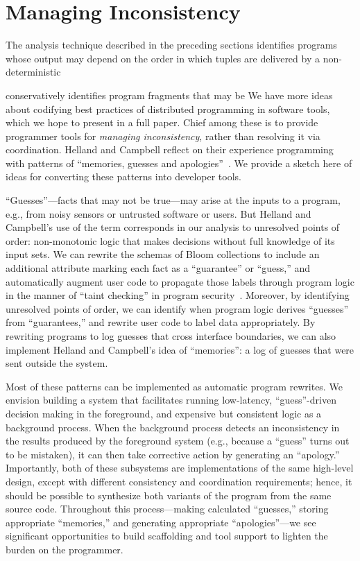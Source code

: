 \section{Managing Inconsistency}
\label{sec:inconsistency}
The analysis technique described in the preceding sections identifies programs
whose output may depend on the order in which tuples are delivered by a
non-deterministic 

 conservatively
identifies program fragments that may be 
We have more ideas about codifying best practices of distributed programming in
software tools, which we hope to present in a full paper.  Chief among these is
to provide programmer tools for \emph{managing inconsistency}, rather than
resolving it via coordination.  Helland and Campbell reflect on their experience
programming with patterns of ``memories, guesses and
apologies''~\cite{quicksand}.  We provide a sketch here of ideas for converting
these patterns into developer tools.

``Guesses''---facts that may not be true---may arise at the inputs to a program,
e.g., from noisy sensors or untrusted software or users.  But Helland and
Campbell's use of the term corresponds in our analysis to unresolved points of
order: non-monotonic logic that makes decisions without full knowledge of its
input sets.  We can rewrite the schemas of Bloom collections to include an
additional attribute marking each fact as a ``guarantee'' or ``guess,'' and
automatically augment user code to propagate those labels through program logic
in the manner of ``taint checking'' in program security~\cite{taint,asbestos}.
Moreover, by identifying unresolved points of order, we can identify when
program logic derives ``guesses'' from ``guarantees,'' and rewrite user code to
label data appropriately. By rewriting programs to log guesses that cross
interface boundaries, we can also implement Helland and Campbell's idea of
``memories'': a log of guesses that were sent outside the system.

Most of these patterns can be implemented as automatic program rewrites. We
envision building a system that facilitates running low-latency,
``guess''-driven decision making in the foreground, and expensive but consistent
logic as a background process. When the background process detects an
inconsistency in the results produced by the foreground system (e.g., because a
``guess'' turns out to be mistaken), it can then take corrective action by
generating an ``apology.'' Importantly, both of these subsystems are
implementations of the same high-level design, except with different consistency
and coordination requirements; hence, it should be possible to synthesize both
variants of the program from the same source code. Throughout this
process---making calculated ``guesses,'' storing appropriate ``memories,'' and
generating appropriate ``apologies''---we see significant opportunities to build
scaffolding and tool support to lighten the burden on the programmer.

